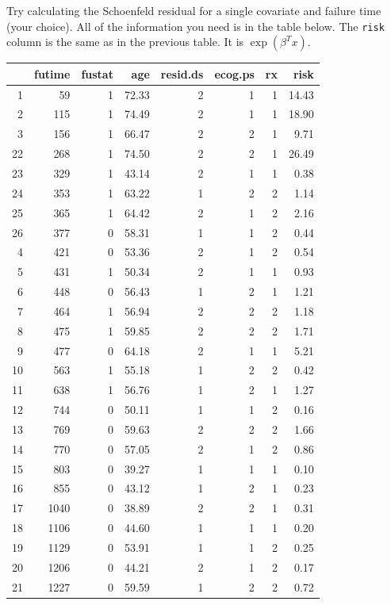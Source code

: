 \begin{question}{}
Try calculating the Schoenfeld residual for a single covariate and failure time (your choice). All of the information you need is in the table below. The \texttt{risk} column is the same as in the previous table. It is $\exp{(\beta^Tx)}$. 
{\small
\begin{center}
\begin{tabular}{rrrrrrrr}
  \hline
 & futime & fustat & age & resid.ds & ecog.ps & rx & risk \\ 
  \hline
1 & 59 & 1 & 72.33 & 2 & 1 & 1 & 14.43 \\ 
  2 & 115 & 1 & 74.49 & 2 & 1 & 1 & 18.90 \\ 
  3 & 156 & 1 & 66.47 & 2 & 2 & 1 & 9.71 \\ 
  22 & 268 & 1 & 74.50 & 2 & 2 & 1 & 26.49 \\ 
  23 & 329 & 1 & 43.14 & 2 & 1 & 1 & 0.38 \\ 
  24 & 353 & 1 & 63.22 & 1 & 2 & 2 & 1.14 \\ 
  25 & 365 & 1 & 64.42 & 2 & 1 & 2 & 2.16 \\ 
  26 & 377 & 0 & 58.31 & 1 & 1 & 2 & 0.44 \\ 
  4 & 421 & 0 & 53.36 & 2 & 1 & 2 & 0.54 \\ 
  5 & 431 & 1 & 50.34 & 2 & 1 & 1 & 0.93 \\ 
  6 & 448 & 0 & 56.43 & 1 & 2 & 1 & 1.21 \\ 
  7 & 464 & 1 & 56.94 & 2 & 2 & 2 & 1.18 \\ 
  8 & 475 & 1 & 59.85 & 2 & 2 & 2 & 1.71 \\ 
  9 & 477 & 0 & 64.18 & 2 & 1 & 1 & 5.21 \\ 
  10 & 563 & 1 & 55.18 & 1 & 2 & 2 & 0.42 \\ 
  11 & 638 & 1 & 56.76 & 1 & 2 & 1 & 1.27 \\ 
  12 & 744 & 0 & 50.11 & 1 & 1 & 2 & 0.16 \\ 
  13 & 769 & 0 & 59.63 & 2 & 2 & 2 & 1.66 \\ 
  14 & 770 & 0 & 57.05 & 2 & 1 & 2 & 0.86 \\ 
  15 & 803 & 0 & 39.27 & 1 & 1 & 1 & 0.10 \\ 
  16 & 855 & 0 & 43.12 & 1 & 2 & 1 & 0.23 \\ 
  17 & 1040 & 0 & 38.89 & 2 & 2 & 1 & 0.31 \\ 
  18 & 1106 & 0 & 44.60 & 1 & 1 & 1 & 0.20 \\ 
  19 & 1129 & 0 & 53.91 & 1 & 1 & 2 & 0.25 \\ 
  20 & 1206 & 0 & 44.21 & 2 & 1 & 2 & 0.17 \\ 
  21 & 1227 & 0 & 59.59 & 1 & 2 & 2 & 0.72 \\ 
   \hline
\end{tabular}
\end{center}
}
\end{question}

